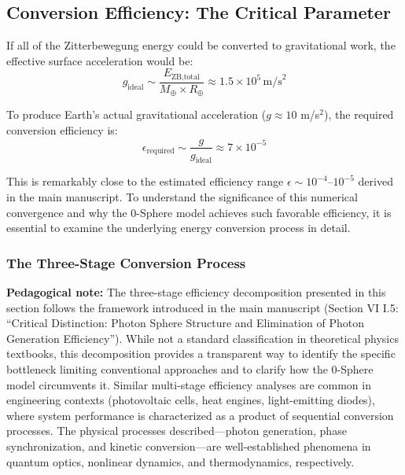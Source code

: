 \documentclass[12pt,letterpaper]{article}
\begin{document}
\subsection{Conversion Efficiency: The Critical Parameter}
\label{subsec:conversion_efficiency}

If all of the Zitterbewegung energy could be converted to gravitational work, the effective surface acceleration would be:
\begin{equation}
g_\text{ideal} \sim \frac{E_\text{ZB,total}}{M_\oplus \times R_\oplus} \approx 1.5 \times 10^5 \, \text{m/s}^2
\end{equation}

To produce Earth's actual gravitational acceleration ($g \approx 10$ m/s$^2$), the required conversion efficiency is:
\begin{equation}
\epsilon_\text{required} \sim \frac{g}{g_\text{ideal}} \approx 7 \times 10^{-5}
\end{equation}

This is remarkably close to the estimated efficiency range $\epsilon \sim 10^{-4}$--$10^{-5}$ derived in the main manuscript. To understand the significance of this numerical convergence and why the 0-Sphere model achieves such favorable efficiency, it is essential to examine the underlying energy conversion process in detail.

\subsubsection{The Three-Stage Conversion Process}
\label{subsubsec:three_stage}

\textbf{Pedagogical note:} The three-stage efficiency decomposition presented in this section follows the framework introduced in the main manuscript (Section VI I.5: ``Critical Distinction: Photon Sphere Structure and Elimination of Photon Generation Efficiency''). While not a standard classification in theoretical physics textbooks, this decomposition provides a transparent way to identify the specific bottleneck limiting conventional approaches and to clarify how the 0-Sphere model circumvents it. Similar multi-stage efficiency analyses are common in engineering contexts (photovoltaic cells, heat engines, light-emitting diodes), where system performance is characterized as a product of sequential conversion processes. The physical processes described—photon generation, phase synchronization, and kinetic conversion—are well-established phenomena in quantum optics, nonlinear dynamics, and thermodynamics, respectively.
\end{document}
